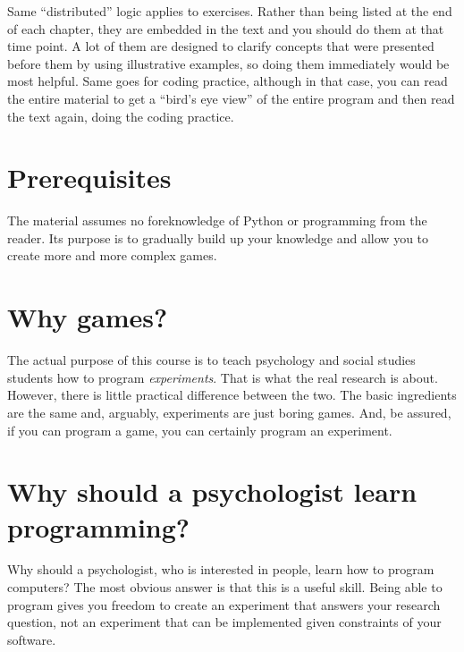 \documentclass[
]{book}
\begin{document}
Same ``distributed'' logic applies to exercises. Rather than being listed at the end of each chapter, they are embedded in the text and you should do them at that time point. A lot of them are designed to clarify concepts that were presented before them by using illustrative examples, so doing them immediately would be most helpful. Same goes for coding practice, although in that case, you can read the entire material to get a ``bird's eye view'' of the entire program and then read the text again, doing the coding practice.

\hypertarget{prerequisites}{%
\section{Prerequisites}\label{prerequisites}}

The material assumes no foreknowledge of Python or programming from the reader. Its purpose is to gradually build up your knowledge and allow you to create more and more complex games.

\hypertarget{why-games}{%
\section{Why games?}\label{why-games}}

The actual purpose of this course is to teach psychology and social studies students how to program \emph{experiments}. That is what the real research is about. However, there is little practical difference between the two. The basic ingredients are the same and, arguably, experiments are just boring games. And, be assured, if you can program a game, you can certainly program an experiment.

\hypertarget{why-should-a-psychologist-learn-programming}{%
\section{Why should a psychologist learn programming?}\label{why-should-a-psychologist-learn-programming}}

Why should a psychologist, who is interested in people, learn how to program computers? The most obvious answer is that this is a useful skill. Being able to program gives you freedom to create an experiment that answers your research question, not an experiment that can be implemented given constraints of your software.
\end{document}
